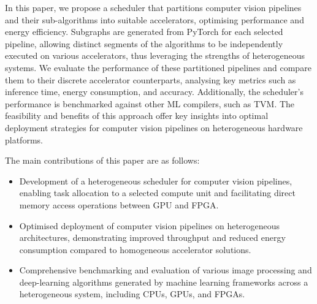 \documentclass[]{spie}  %
\begin{document}
In this paper, we propose a scheduler that partitions computer vision pipelines and their sub-algorithms into suitable accelerators, optimising performance and energy efficiency. Subgraphs are generated from PyTorch for each selected pipeline, allowing distinct segments of the algorithms to be independently executed on various accelerators, thus leveraging the strengths of heterogeneous systems. We evaluate the performance of these partitioned pipelines and compare them to their discrete accelerator counterparts, analysing key metrics such as inference time, energy consumption, and accuracy. Additionally, the scheduler's performance is benchmarked against other ML compilers, such as TVM. The feasibility and benefits of this approach offer key insights into optimal deployment strategies for computer vision pipelines on heterogeneous hardware platforms.




The main contributions of this paper are as follows:
\begin{itemize}
\item Development of a heterogeneous scheduler for computer vision pipelines, enabling task allocation to a selected compute unit and facilitating direct memory access operations between GPU and FPGA.
\item Optimised deployment of computer vision pipelines on heterogeneous architectures, demonstrating improved throughput and reduced energy consumption compared to homogeneous accelerator solutions.
\item Comprehensive benchmarking and evaluation of various image processing and deep-learning algorithms generated by machine learning frameworks across a heterogeneous system, including CPUs, GPUs, and FPGAs.
\end{itemize}

\newpage
\end{document}
